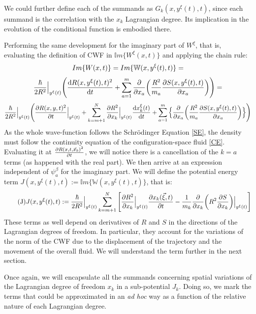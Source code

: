 \documentclass[11pt, a4paper]{article} %
\newcommand{\W}{\mathbb{W}}
\begin{document}
We could further define each of the summands as $G_k(x,y^\xi(t),t)$, since each summand is the correlation with the $x_k$ Lagrangian degree. Its implication in the evolution of the conditional function is embodied there.

Performing the same development for the imaginary part of $W^\xi$, that is, evaluating the definition of CWF in $\mathbb{I}m\{W^\xi(x,t)\}$ and applying the chain rule:
$$
Im\{W(x,t)\}=Im\{\W(x, y^\xi(t),t)\}=\vspace{-0.1cm}
$$
$$
\frac{\hbar}{2R^2}\Big\rvert_{y^\xi(t)} \qty( \dv{R(x, y^\xi(t),t)^2}{t} + \sum_{a=1}^m\pdv{}{x_a} \qty(\frac{R^2}{m_a} \pdv{S(x, y^\xi(t),t)}{x_a} ))=\vspace{-0.1cm}
$$
$$
\frac{\hbar}{2R^2}\Big\rvert_{y^\xi(t)} \qty( \pdv{R(x,y,t)^2}{t}\Big\rvert_{y^\xi(t)} + \sum_{k=m+1}^N \pdv{R^2}{x_k}\Big\rvert_{y^\xi(t)} \dv{x_k^\xi(t)}{t} + \sum_{a=1}^m\Big\{\pdv{}{x_a} \qty(\frac{R^2}{m_a} \pdv{S(x, y^\xi(t),t)}{x_a} ) \Big\})
$$
As the whole wave-function follows the Schrödinger Equation \eqref{SE}, the density must follow the continuity equation of the configuration-space fluid \eqref{CE}. Evaluating it at $\pdv{R(x,t, \vec{x}_b)^2}{t}$, we will notice there is a cancellation of the $k=a$ terms (as happened with the real part). We then arrive at an expression independent of $\psi_a^\beta$ for the imaginary part. We will define the potential energy term $J(x, y^\xi(t),t):=\mathbb{I}m\{\W(x, y^\xi(t),t)\}$, that is:
\begin{equation}\label{J}\tag{J}
J(x, y^\xi(t),t):= \frac{\hbar}{2R^2}\Big\rvert_{y^\xi(t)} \sum_{k=m+1}^N \qty[ \pdv{R^2}{x_k}\Big\rvert_{y^\xi(t)} \pdv{x_k(\vec{\xi},t)}{t} - \frac{1}{m_k} \pdv{}{x_k} \qty(R^2 \pdv{S}{x_k} )\Big\rvert_{y^\xi(t)} ]
\end{equation}
These terms as well depend on derivatives of $R$ and $S$ in the directions of the Lagrangian degrees of freedom. In particular, they account for the variations of the norm of the CWF due to the displacement of the trajectory and the movement of the overall fluid. We will understand the term further in the next section.

Once again, we will encapsulate all the summands concerning spatial variations of the Lagrangian degree of freedom $x_k$ in a sub-potential $J_k$. Doing so, we mark the terms that could be approximated in an {\em ad hoc} way as a function of the relative nature of each Lagrangian degree.
\end{document}
